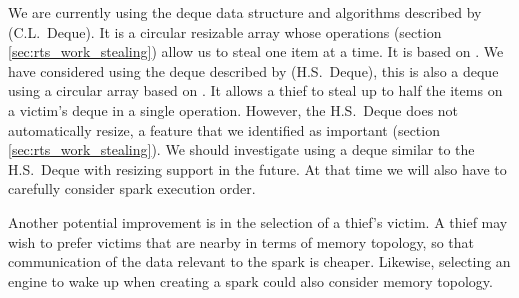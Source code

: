We are currently using the deque data structure and algorithms described by
\citet{Chase_2005_wsdeque} (C.L.\ Deque).
It is a circular resizable array whose operations
(section \ref{sec:rts_work_stealing})
allow us to steal one item at a time.
It is based on \citet{arora:1998:work-stealing}.
We have considered using the deque described by
\citet{hendler:2002:stealhalf} (H.S.\ Deque),
this is also a deque using a circular array 
based on \citet{arora:1998:work-stealing}.
It allows a thief to steal up to half the items on a victim's deque
in a single operation.
However, the H.S.\ Deque does not automatically resize,
a feature that we identified as important (section \ref{sec:rts_work_stealing}).
We should investigate using a deque similar to the H.S.\ Deque with resizing
support in the future.
At that time we will also have to carefully consider spark execution order.

Another potential improvement is in the selection of a thief's victim.
A thief may wish to prefer victims that are nearby in terms of memory
topology, so that communication of the data relevant to the spark is
cheaper.
Likewise, selecting an engine to wake up when creating a spark could also
consider memory topology.

